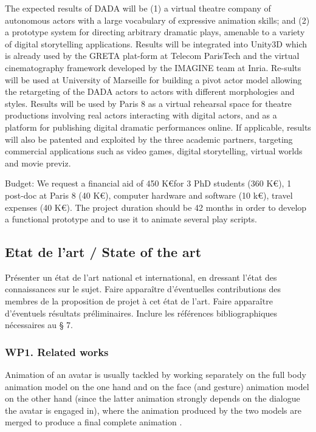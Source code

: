 The expected results of DADA will be (1) a virtual theatre company of autonomous actors with a large vocabulary of expressive animation skills; and (2) a prototype system for directing arbitrary dramatic plays, amenable to a variety of digital storytelling applications. Results will be integrated into Unity3D which is already used by the GRETA plat-form at Telecom ParisTech and the virtual cinematography framework developed by the IMAGINE team at Inria. Re-sults will be used at University of Marseille for building a pivot actor model allowing the retargeting of the DADA actors to actors with different morphologies and styles. Results will be used by Paris 8 as a virtual rehearsal space for theatre productions involving real actors interacting with digital actors, and as a platform for publishing digital dramatic performances online. If applicable, results will also be patented and exploited by the three academic partners, targeting commercial applications such as video games, digital storytelling, virtual 
worlds and movie previz.

Budget: We request a financial aid of 450 K\euro for 3 PhD students (360 K\euro), 1 post-doc at Paris 8 (40 K\euro), computer hardware and software (10 k\euro), travel expenses (40 K\euro). The project duration should be 42 months in order to develop a functional prototype and to use it to animate several play scripts.



\subsection{Etat de l'art / State of the art}
\begin{xcomment}  
Pr\'esenter un \'etat de l'art national et international, en dressant l'\'etat des connaissances sur le sujet. 
Faire apparaître d'\'eventuelles contributions des membres de la proposition de projet à cet \'etat de l'art.
Faire apparaître d'\'eventuels r\'esultats pr\'eliminaires. 
Inclure les r\'ef\'erences bibliographiques n\'ecessaires au § 7.
\end{xcomment}



\subsubsection{WP1. Related works}

Animation of an avatar is usually tackled by working separately on the full body animation model on the one hand and on the face (and gesture) animation model on the other hand (since the latter animation strongly depends on the dialogue the avatar is engaged in), where the animation produced by the two models are merged to produce a final complete animation \cite{DBLP:journals/tvcg/ShoulsonMKB14}. 


